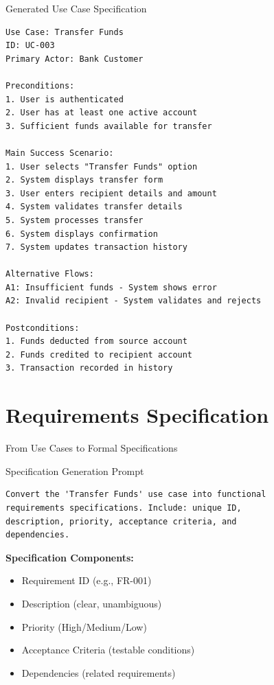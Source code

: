 \documentclass{beamer}
\begin{document}
\begin{frame}[fragile]{Generated Use Case Specification}
    \lstset{style=code}
    \begin{lstlisting}[caption={Transfer Funds Use Case Specification}]
Use Case: Transfer Funds
ID: UC-003
Primary Actor: Bank Customer

Preconditions:
1. User is authenticated
2. User has at least one active account
3. Sufficient funds available for transfer

Main Success Scenario:
1. User selects "Transfer Funds" option
2. System displays transfer form
3. User enters recipient details and amount
4. System validates transfer details
5. System processes transfer
6. System displays confirmation
7. System updates transaction history

Alternative Flows:
A1: Insufficient funds - System shows error
A2: Invalid recipient - System validates and rejects

Postconditions:
1. Funds deducted from source account
2. Funds credited to recipient account
3. Transaction recorded in history
    \end{lstlisting}
\end{frame}

\section{Requirements Specification}

\begin{frame}[fragile]{From Use Cases to Formal Specifications}
    \begin{block}{Specification Generation Prompt}
        \lstset{style=code}
        \begin{lstlisting}
Convert the 'Transfer Funds' use case into functional 
requirements specifications. Include: unique ID, 
description, priority, acceptance criteria, and 
dependencies.
        \end{lstlisting}
    \end{block}
    
    \textbf{Specification Components:}
    \begin{itemize}
        \item Requirement ID (e.g., FR-001)
        \item Description (clear, unambiguous)
        \item Priority (High/Medium/Low)
        \item Acceptance Criteria (testable conditions)
        \item Dependencies (related requirements)
    \end{itemize}
\end{frame}
\end{document}
